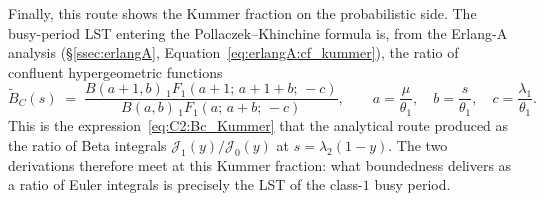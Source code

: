 Finally, this route shows the Kummer fraction on the probabilistic side. The busy-period LST entering the Pollaczek--Khinchine formula is, from the Erlang-A analysis (\S\ref{ssec:erlangA}, Equation~\eqref{eq:erlangA:cf_kummer}), the ratio of confluent hypergeometric functions
\begin{equation*}
    \widetilde{B}_C(s) \;=\; \frac{B(a+1,b)\,{}_1F_1(a+1;\,a+1+b;\,-c)}{B(a,b)\,{}_1F_1(a;\,a+b;\,-c)},
    \qquad a=\frac{\mu}{\theta_1},\quad b=\frac{s}{\theta_1},\quad c=\frac{\lambda_1}{\theta_1}.
\end{equation*}
This is the expression~\eqref{eq:C2:Bc_Kummer} that the analytical route produced as the ratio of Beta integrals $\mathcal{J}_1(y)/\mathcal{J}_0(y)$ at $s=\lambda_2(1-y)$. The two derivations therefore meet at this Kummer fraction: what boundedness delivers as a ratio of Euler integrals is precisely the LST of the class-$1$ busy period.
